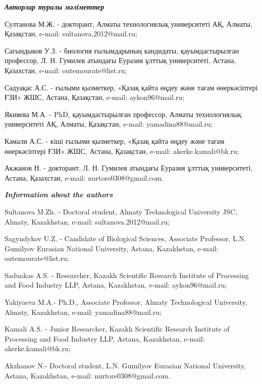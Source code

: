 \begin{info}
\hspace{1em}\emph{{\bfseries Авторлар туралы мәліметтер}}

Султанова М.Ж. - докторант, Алматы технологиялық университеті АҚ,
Алматы, Қазақстан, e-mail:
sultanova.2012@mail.ru;

Сагындыков У.З. - биология ғылымдарының кандидаты, қауымдастырылған
профессор, Л. Н. Гумилев атындағы Еуразия ұлттық университеті, Астана,
Қазахстан, e-mail: outemourate@list.ru;

Сәдуақас А.С. - ғылыми қызметкер, «Қазақ қайта өңдеу және тағам
өнеркәсіптері ҒЗИ» ЖШС, Астана, Қазақстан, e-mail: aykon96@mail.ru;

Якияева М.А. - PhD, қауымдастырылған профессор, Алматы технологиялық
университеті АҚ, Алматы, Қазақстан, e-mail: yamadina88@mail.ru;

Камали А.С. - кіші ғылыми қызметкер, «Қазақ қайта өңдеу және тағам
өнеркәсіптері ҒЗИ» ЖШС, Астана, Қазақстан, e-mail: akerke.kamali@bk.ru;

Акжанов Н. - докторант, Л. Н. Гумилев атындағы Еуразия ұлттық
университеті, Астана, Қазахстан, e-mail: nurtore0308@gmail.com.

\hspace{1em}\emph{{\bfseries Information about the authors}}

Sultanova M.Zh. - Doctoral student, Almaty Technological University JSC,
Almaty, Kazakhstan, e-mail: sultanova.2012@mail.ru;

Sagyndykov U.Z. - Candidate of Biological Sciences, Associate Professor,
L.N. Gumilyov Eurasian National University, Astana, Kazakhstan, e-mail:
outemourate@list.ru;

Saduakas A.S. - Researcher, Kazakh Scientific Research Institute of
Processing and Food Industry LLP, Astana, Kazakhstan, e-mail:
aykon96@mail.ru;

Yakiyaeva M.A.- Ph.D., Associate Professor, Almaty Technological
University, Almaty, Kazakhstan, e-mail: yamadina88@mail.ru;

Kamali A.S. - Junior Researcher, Kazakh Scientific Research Institute of
Processing and Food Industry LLP, Astana, Kazakhstan, e-mail:
akerke.kamali@bk.ru;

Akzhanov N.- Doctoral student, L.N. Gumilyov Eurasian National
University, Astana, Kazakhstan, e-mail:
nurtore0308@gmail.com.
\end{info}

